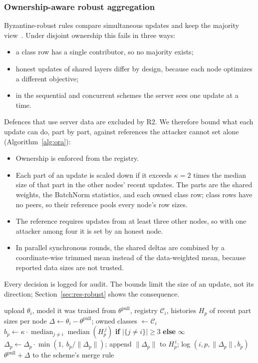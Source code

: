 \documentclass[pdflatex,sn-mathphys-num]{sn-jnl}
\begin{document}
\subsubsection{Ownership-aware robust aggregation}\label{sec:defence}
Byzantine-robust rules compare simultaneous updates and keep the majority view~\cite{blanchard2017krum,yin2018byzantine}. Under disjoint ownership this fails in three ways:
\begin{itemize}
\item a class row has a single contributor, so no majority exists;
\item honest updates of shared layers differ by design, because each node optimizes a different objective;
\item in the sequential and concurrent schemes the server sees one update at a time.
\end{itemize}
Defences that use server data are excluded by R2. We therefore bound what each update can do, part by part, against references the attacker cannot set alone (Algorithm~\ref{alg:ora}):
\begin{itemize}
\item Ownership is enforced from the registry.
\item Each part of an update is scaled down if it exceeds $\kappa=2$ times the median size of that part in the other nodes' recent updates. The parts are the shared weights, the BatchNorm statistics, and each owned class row; class rows have no peers, so their reference pools every node's row sizes.
\item The reference requires updates from at least three other nodes, so with one attacker among four it is set by an honest node.
\item In parallel synchronous rounds, the shared deltas are combined by a coordinate-wise trimmed mean instead of the data-weighted mean, because reported data sizes are not trusted.
\end{itemize}
Every decision is logged for audit. The bounds limit the size of an update, not its direction; Section~\ref{sec:res-robust} shows the consequence.

\begin{algorithm}[t]
\caption{Ownership-aware screening of one upload from node $i$}\label{alg:ora}
\begin{algorithmic}[1]
\Require upload $\theta_i$, model it was trained from $\theta^{\text{pull}}$, registry $\mathcal{C}_i$, histories $H_p$ of recent part sizes per node
\State $\Delta \gets \theta_i-\theta^{\text{pull}}$; \quad owned classes $\gets \mathcal{C}_i$ 
  \State $b_p \gets \kappa\cdot\operatorname{median}_{j\neq i}\operatorname{median}(H_p^{\,j})$ \textbf{if} $|\{j\neq i\}|\ge 3$ \textbf{else} $\infty$
  \State $\Delta_p \gets \Delta_p\cdot\min\!\left(1,\ b_p/\lVert\Delta_p\rVert\right)$; \quad append $\lVert\Delta_p\rVert$ to $H_p^{\,i}$; \quad log $(i,p,\lVert\Delta_p\rVert,b_p)$
\EndFor
\State \Return $\theta^{\text{pull}}+\Delta$ to the scheme's merge rule
\end{algorithmic}
\end{algorithm}
\end{document}
